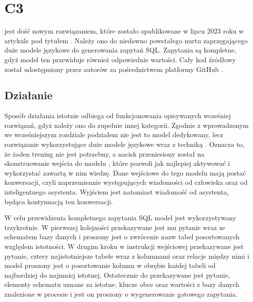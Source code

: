 \section{C3}
 jest dość nowym rozwiązaniem, które zostało opublikowane w lipcu 2023 roku w artykule pod tytułem  . Należy ono do niedawno powstałego nurtu zaprzęgającego duże modele językowe do generowania zapytań SQL. Zapytania są kompletne, gdyż model ten przewiduje również odpowiednie wartości. Cały kod źródłowy  został udostępniony przez autorów za pośrednictwem platformy GitHub . 

\subsection{Działanie}
Sposób działania  istotnie odbiega od funkcjonowania opisywanych wcześniej rozwiązań, gdyż należy ono do zupełnie innej kategorii. Zgodnie z wprowadzonym we wcześniejszym rozdziale podziałem nie jest to model dedykowany, lecz rozwiązanie wykorzystujące duże modele językowe wraz z techniką . Oznacza to, że żaden trening nie jest potrzebny, a nacisk przeniesiony został na skonstruowanie wejścia do modelu , które pozwoli jak najlepiej aktywować i wykorzystać zawartą w nim wiedzę. Dane wejściowe do tego modelu mają postać konwersacji, czyli naprzemiennie występujących wiadomości od człowieka oraz od inteligentnego asystenta. Wyjściem jest natomiast wiadomość od asystenta, będąca kontynuacją ten konwersacji.

W celu przewidzenia kompletnego zapytania SQL model  jest wykorzystywany trzykrotnie. W pierwszej kolejności przekazywane jest mu pytanie wraz ze schematem bazy danych i proszony jest o zwrócenie nazw tabel posortowanych względem istotności. W drugim kroku w instrukcji wejściowej przekazywane jest pytanie, cztery najistotniejsze tabele wraz z kolumnami oraz relacje między nimi i model proszony jest o posortowanie kolumn w obrębie każdej tabeli od najbardziej do najmniej istotnej. Ostatecznie do  przekazywane jest pytanie, elementy schematu uznane za istotne, klucze obce oraz wartości z bazy danych znalezione w procesie  i jest on proszony o wygenerowanie gotowego zapytania.

